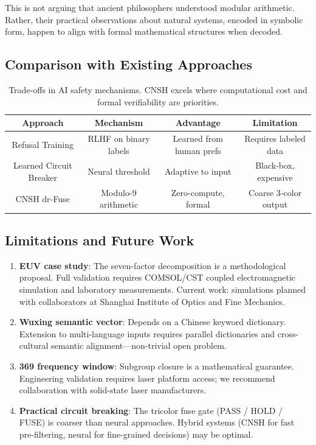 \documentclass[twocolumn]{article}
\begin{document}
This is not arguing that ancient philosophers understood modular arithmetic. Rather, their practical observations about natural systems, encoded in symbolic form, happen to align with formal mathematical structures when decoded.

\subsection{Comparison with Existing Approaches}

\begin{table}[h]
\centering
\begin{tabular}{|c|c|c|c|}
\hline
Approach & Mechanism & Advantage & Limitation \\
\hline
Refusal Training & RLHF on binary labels & Learned from human prefs & Requires labeled data \\
\hline
Learned Circuit Breaker & Neural threshold & Adaptive to input & Black-box, expensive \\
\hline
CNSH dr-Fuse & Modulo-9 arithmetic & Zero-compute, formal & Coarse 3-color output \\
\hline
\end{tabular}
\caption{Trade-offs in AI safety mechanisms. CNSH excels where computational cost and formal verifiability are priorities.}
\end{table}

\subsection{Limitations and Future Work}

\begin{enumerate}
  \item \textbf{EUV case study}: The seven-factor decomposition is a methodological proposal. Full validation requires COMSOL/CST coupled electromagnetic simulation and laboratory measurements. Current work: simulations planned with collaborators at Shanghai Institute of Optics and Fine Mechanics.
  
  \item \textbf{Wuxing semantic vector}: Depends on a Chinese keyword dictionary. Extension to multi-language inputs requires parallel dictionaries and cross-cultural semantic alignment—non-trivial open problem.
  
  \item \textbf{369 frequency window}: Subgroup closure is a mathematical guarantee. Engineering validation requires laser platform access; we recommend collaboration with solid-state laser manufacturers.
  
  \item \textbf{Practical circuit breaking}: The tricolor fuse gate (PASS / HOLD / FUSE) is coarser than neural approaches. Hybrid systems (CNSH for fast pre-filtering, neural for fine-grained decisions) may be optimal.
\end{enumerate}
\end{document}
